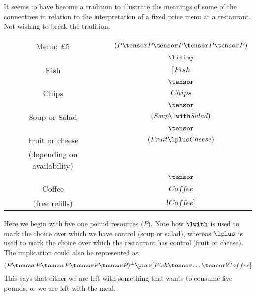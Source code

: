 It seems to have become a tradition to illustrate the meanings of some
of the connectives in relation to the interpretation of a fixed price
menu at a restaurant.  Not wishing to break the tradition:
\begin{center}
\begin{tabular}{ccc}
Menu: \pounds 5       & \hspace*{3em} & $(P\tensor P\tensor P\tensor P\tensor P)$\\
                      & & $\linimp$\\
Fish                  & & $[Fish$\\
                      & & $\tensor$\\
Chips                 & & $Chips$\\
                      & & $\tensor$\\
Soup or Salad         & & $(Soup \lwith Salad)$\\
                      & & $\tensor$\\
Fruit or cheese       & & $(Fruit \lplus Cheese)$\\ 
(depending on availability) & & \\
                      & & $\tensor$\\
Coffee                & & $Coffee$\\
(free refills)        & & $!Coffee]$ 
\end{tabular}
\end{center}
Here we begin with five one pound resources ($P$).  Note how $\lwith$
is used to mark the choice over which we have control (soup or salad),
whereas $\lplus$ is used to mark the choice over which the restaurant
has control (fruit or cheese).  The implication could also be
represented as
\[(P\tensor P\tensor P\tensor P\tensor P)^{\bot} \parr [Fish\tensor\ldots
\tensor !Coffee]\]
This says that either we are left with something that wants to consume
five pounds, or we are left with the meal.


